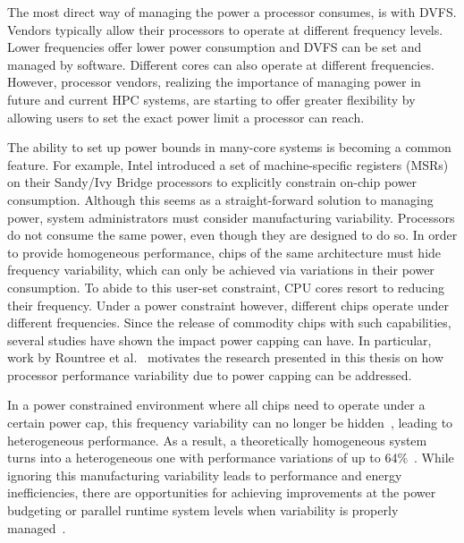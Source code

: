 The most direct way of managing the power a processor consumes, is with DVFS.  Vendors 
typically allow their processors to operate at different frequency levels.  Lower frequencies
offer lower power consumption and DVFS can be set and managed by software.  Different cores
can also operate at different frequencies.
However, processor vendors, realizing the importance of managing power in future and current
HPC systems, are starting to offer greater flexibility by allowing users to set the exact 
power limit a processor can reach. 


The ability to set up power bounds in many-core systems is becoming a common feature.
For example, Intel introduced a set of machine-specific registers (MSRs)~\cite{libmsr} on their Sandy/Ivy Bridge processors to explicitly constrain on-chip power consumption. 
Although this seems as a straight-forward solution to managing power, system administrators must
consider manufacturing variability.  Processors do not consume the same power, even though they
are designed to do so.
In order to provide homogeneous performance,
chips of the same architecture must hide frequency variability, which can only be achieved via variations in their power consumption.
To abide to this user-set constraint, CPU cores resort to reducing their frequency. Under a power constraint however, different chips operate under different frequencies.
Since the release of commodity chips with such capabilities, several studies have shown the impact power capping can have. %
In particular, work by Rountree et al.~\cite{Rountree2012} motivates the research presented in this 
thesis on how processor performance variability due to power capping can be addressed. 


In a power constrained environment where all chips need to operate under a certain power cap, this frequency variability can no longer be hidden~\cite{Rountree:2012:BDF:2357488.2357648}, leading to heterogeneous performance.
As a result, a theoretically homogeneous system turns into a heterogeneous one with performance variations of up to 64\%~\cite{Inadomi:2015:AMI:2807591.2807638}.  
While ignoring this manufacturing variability leads to performance 
and energy inefficiencies, 
there are opportunities for achieving improvements at the power budgeting or parallel runtime system levels when variability is properly managed~\cite{Chasapis:2016:RMM:2925426.2926279,Teodorescu:2008:VAS:1381306.1382152,Inadomi:2015:AMI:2807591.2807638,Gholkar:2016:PTH:2967938.2967961,Totoni:tech:2014}.


